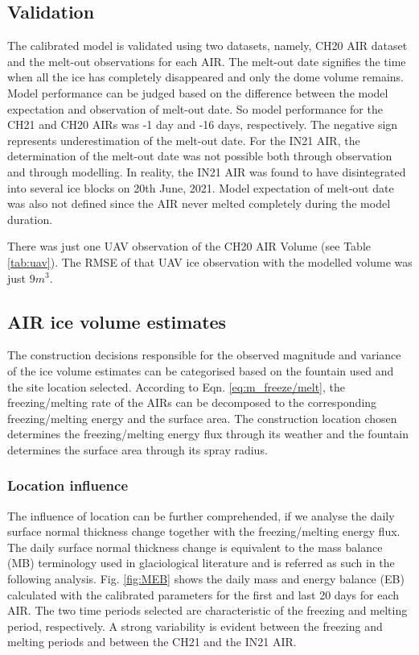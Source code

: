 \documentclass[utf8]{frontiersSCNS} %
\begin{document}
\subsection{Validation}

The calibrated model is validated using two datasets, namely, CH20 AIR dataset and the melt-out observations for
each AIR. The melt-out date signifies the time when all the ice has completely disappeared and only the dome volume
remains. Model performance can be judged based on the difference between the model expectation and observation of
melt-out date.  So model performance for the CH21 and CH20 AIRs was -1 day and -16 days, respectively. The negative
sign represents underestimation of the melt-out date. For the IN21 AIR, the determination of the melt-out date was
not possible both through observation and through modelling.  In reality, the IN21 AIR was found to have
disintegrated into several ice blocks on 20th June, 2021.  Model expectation of melt-out date was also not defined
since the AIR never melted completely during the model duration.

There was just one UAV observation of the CH20 AIR Volume (see Table \ref{tab:uav}).  The RMSE of that UAV ice
observation with the modelled volume was just $9 m^3$.

\subsection{AIR ice volume estimates}

The construction decisions responsible for the observed magnitude and variance of the ice volume estimates can
be categorised based on the fountain used and the site location selected. According to Eqn.
\ref{eq:m_freeze/melt}, the freezing/melting rate of the AIRs can be decomposed to the corresponding
freezing/melting energy and the surface area. The construction location chosen determines the freezing/melting
energy flux through its weather and the fountain determines the surface area through its spray radius.

\subsubsection{Location influence}

The influence of location can be further comprehended, if we analyse the daily surface normal thickness change
together with the freezing/melting energy flux. The daily surface normal thickness change is equivalent to the
mass balance (MB) terminology used in glaciological literature and is referred as such in the following
analysis. Fig.  \ref{fig:MEB} shows the daily mass and energy balance (EB) calculated with the calibrated
parameters for the first and last 20 days for each AIR. The two time periods selected are characteristic of the
freezing and melting period, respectively. A strong variability is evident between the freezing and melting
periods and between the CH21 and the IN21 AIR.
\end{document}
